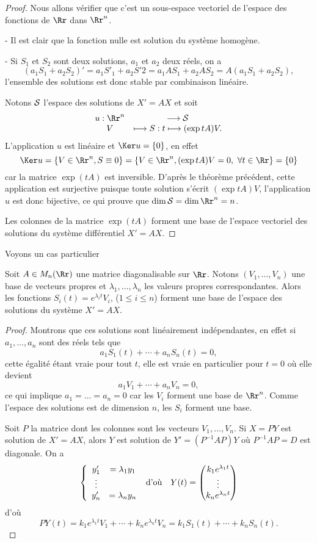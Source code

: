 \documentclass[class=report,crop=false]{standalone}
\begin{document}
\begin{proof}
Nous allons vérifier que c'est un sous-espace vectoriel de l'espace des fonctions de $\Rr$ dans $\Rr^n$.

- Il est clair que la fonction nulle est solution du système homogène.

- Si $S_1$ et $S_2$ sont deux solutions, $a_1$ et $a_2$ deux réels, on a 
$$(a_1S_1+a_2S_2)'=a_1S'_1+a_2S'2=a_1AS_1+a_2AS_2=A(a_1S_1+a_2S_2),$$
l'ensemble des solutions est donc stable par combinaison linéaire.

Notons $\cal S$ l'espace des solutions de $X'=AX$ et soit 
$$\begin{array}{cc}u:\Rr^n&\longrightarrow {\cal S}\cr V&\longmapsto S:t\longmapsto(\exp tA)V.\end{array}$$ 
L'application $u$ est linéaire et $\Ker u=\{0\}$, en effet
$$\Ker u=\{V\in\Rr^n, S\equiv 0\}=\{V\in\Rr^n, (\exp tA)V=0,\  \forall t\in \Rr\}=\{0\}$$
car la matrice $\exp(tA)$ est inversible. D'après le théorème précédent, cette application est surjective puisque toute solution s'écrit $(\exp tA)V$, l'application $u$ est donc bijective, ce qui prouve que $\dim {\cal S}=\dim \Rr^n=n$.

Les colonnes de la matrice $\exp(tA)$ forment une base de l'espace vectoriel des solutions du système différentiel $X'=AX$.
\end{proof}


Voyons un cas particulier 


\begin{proposition}
Soit $A\in M_n(\Rr)$ une matrice diagonalisable sur $\Rr$. Notons 
$( {V_1},\ldots,{V_n})$ une base
 de vecteurs propres et $\lambda_1,\ldots,\lambda_n$ les valeurs propres correspondantes. Alors les fonctions
 $S_i(t)=e^{\lambda_i t}{{V_i}}$, ($1\leq i\leq n$) forment une base de l'espace des solutions du système $X'=AX$.
\end{proposition}

\begin{proof}
Montrons que ces solutions sont linéairement indépendantes, en effet si $a_1,\dots,a_n$ sont des réels tels que 
$$a_1S_1(t)+\cdots+a_nS_n(t)=0,$$
cette égalité étant vraie pour tout $t$, elle est vraie en particulier pour $t=0$ où elle devient
$$a_1V_1+\cdots+a_nV_n=0,$$
ce qui implique $a_1=\dots=a_n=0$ car les $V_i$ forment une base de $\Rr^n$. Comme l'espace des solutions est de dimension $n$, les $S_i$ forment une base. 

Soit $P$ la matrice dont les colonnes sont les vecteurs $V_1,\dots,V_n$. Si $X=PY$ est solution de $X'=AX$, alors $Y$ est solution de $Y'=(P^{-1}AP)Y$ où $P^{-1}AP=D$ est diagonale. On a 
$$\left\{\begin{array}{cc}y'_1&=\lambda_1y_1\cr \vdots\cr y'_n&=\lambda_ny_n\end{array}\right.\ {\hbox{d'où}}\ \ \ 
Y(t)=\left(\begin{matrix}k_1e^{\lambda_1t}\cr \vdots\cr k_ne^{\lambda_nt}\end{matrix}\right)$$
d'où 
$$PY(t)=k_1e^{\lambda_1t}V_1+\cdots+k_ne^{\lambda_nt}V_n=k_1S_1(t)+\cdots+k_nS_n(t).$$
\end{proof}
\end{document}
